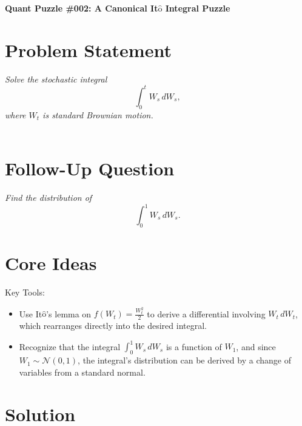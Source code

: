 \documentclass[12pt]{article}
\newcommand{\Ito}{It$\hat{\text{o}}$ }
\newcommand{\Itos}{It$\hat{\text{o}}$'s }
\begin{document}
\begin{center}
    \Large \textbf{Quant Puzzle \#002: A Canonical \Ito Integral Puzzle}
\end{center}

\section*{Problem Statement}
\textit{Solve the stochastic integral}
\[
\int_0^t W_s \, dW_s,
\]
\textit{where \(W_t\) is standard Brownian motion.}\\ \\
\section*{Follow-Up Question}
\textit{Find the distribution of}
\[
\int_0^1 W_s \, dW_s.
\]


\bigskip

\section*{Core Ideas}
Key Tools:
\begin{itemize}
    \item Use \Itos lemma on $f(W_t) = \frac{W_t^2}{2}$ to derive a differential involving $W_t \, dW_t$, which rearranges directly into the desired integral.
    \item Recognize that the integral $\int_0^1 W_s \, dW_s$ is a function of \(W_1\), and since \(W_1 \sim \mathcal{N}(0,1)\), the integral's distribution can be derived by a change of variables from a standard normal.
\end{itemize}

\bigskip

\section*{Solution}
\end{document}
